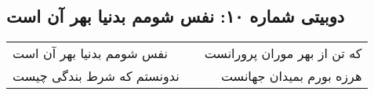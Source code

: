 \begin{center}
\section*{دوبیتی شماره ۱۰: نفس شومم بدنیا بهر آن است}
\label{sec:010}
\begin{longtable}{l p{0.5cm} r}
نفس شومم بدنیا بهر آن است
&&
که تن از بهر موران پرورانست
\\
ندونستم که شرط بندگی چیست
&&
هرزه بورم بمیدان جهانست
\\
\end{longtable}
\end{center}
